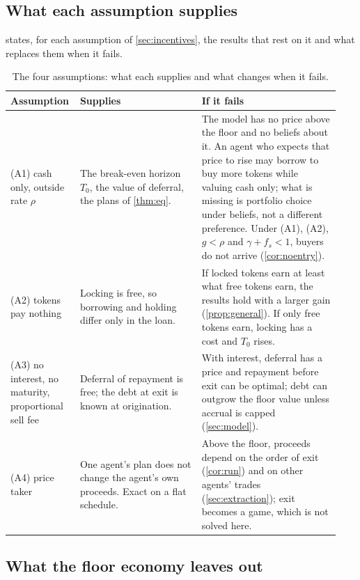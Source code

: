 \subsection{What each assumption supplies}

 states, for each assumption of \cref{sec:incentives}, the results that rest on it and what replaces them when it fails.

\begin{table}[t]
\centering\small
\caption{The four assumptions: what each supplies and what changes when it fails.}\label{tab:assumptions}
\begin{tabular}{@{}p{0.17\linewidth}p{0.36\linewidth}p{0.41\linewidth}@{}}
\toprule
Assumption & Supplies & If it fails \\
\midrule
(A1) cash only, outside rate $\rho$ & The break-even horizon $T_0$, the value of deferral, the plans of \cref{thm:eq}. & The model has no price above the floor and no beliefs about it. An agent who expects that price to rise may borrow to buy more tokens while valuing cash only; what is missing is portfolio choice under beliefs, not a different preference. Under (A1), (A2), $g<\rho$ and $\gamma+f_s<1$, buyers do not arrive (\cref{cor:noentry}). \\
(A2) tokens pay nothing & Locking is free, so borrowing and holding differ only in the loan. & If locked tokens earn at least what free tokens earn, the results hold with a larger gain (\cref{prop:general}). If only free tokens earn, locking has a cost and $T_0$ rises. \\
(A3) no interest, no maturity, proportional sell fee & Deferral of repayment is free; the debt at exit is known at origination. & With interest, deferral has a price and repayment before exit can be optimal; debt can outgrow the floor value unless accrual is capped (\cref{sec:model}). \\
(A4) price taker & One agent's plan does not change the agent's own proceeds. Exact on a flat schedule. & Above the floor, proceeds depend on the order of exit (\cref{cor:run}) and on other agents' trades (\cref{sec:extraction}); exit becomes a game, which is not solved here. \\
\bottomrule
\end{tabular}
\end{table}

\subsection{What the floor economy leaves out}

